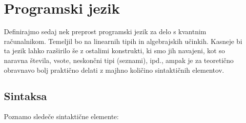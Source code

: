 \section{Programski jezik}
Definirajmo sedaj nek preprost programski jezik za delo s kvantnim računalnikom.
Temeljil bo na linearnih tipih in algebrajskih učinkih.
Kasneje bi ta jezik lahko razširilo še z ostalimi konstrukti, ki smo jih navajeni, kot so naravna števila, vsote, neskončni tipi (seznami), ipd., ampak je za teoretično obravnavo bolj praktično delati z majhno količino sintaktičnih elementov.

\subsection{Sintaksa}
Poznamo sledeče sintaktične elemente:\\
